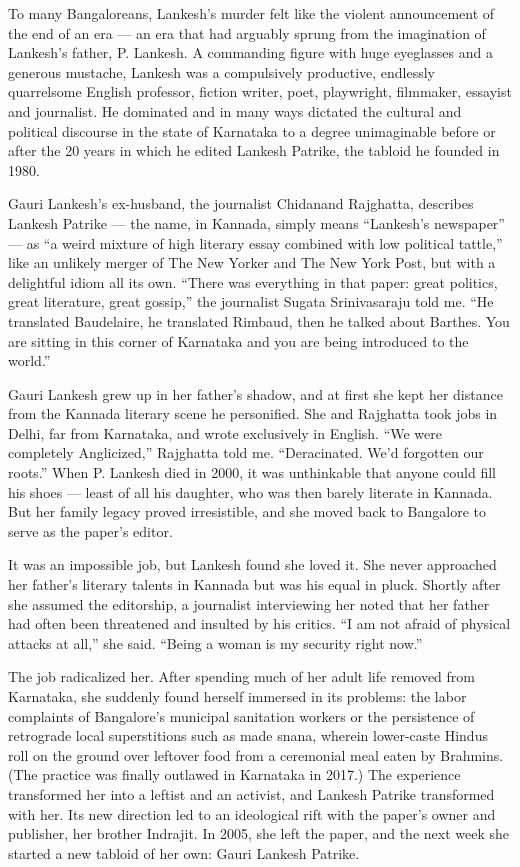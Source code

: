 To many Bangaloreans, Lankesh's murder felt like the violent
announcement of the end of an era --- an era that had arguably sprung
from the imagination of Lankesh's father, P. Lankesh. A commanding
figure with huge eyeglasses and a generous mustache, Lankesh was a
compulsively productive, endlessly quarrelsome English professor,
fiction writer, poet, playwright, filmmaker, essayist and journalist. He
dominated and in many ways dictated the cultural and political discourse
in the state of Karnataka to a degree unimaginable before or after the
20 years in which he edited Lankesh Patrike, the tabloid he founded in
1980.

Gauri Lankesh's ex-husband, the journalist Chidanand Rajghatta,
describes Lankesh Patrike --- the name, in Kannada, simply means
``Lankesh's newspaper'' --- as ``a weird mixture of high literary essay
combined with low political tattle,'' like an unlikely merger of The New
Yorker and The New York Post, but with a delightful idiom all its own.
``There was everything in that paper: great politics, great literature,
great gossip,'' the journalist Sugata Srinivasaraju told me. ``He
translated Baudelaire, he translated Rimbaud, then he talked about
Barthes. You are sitting in this corner of Karnataka and you are being
introduced to the world.''

Gauri Lankesh grew up in her father's shadow, and at first she kept her
distance from the Kannada literary scene he personified. She and
Rajghatta took jobs in Delhi, far from Karnataka, and wrote exclusively
in English. ``We were completely Anglicized,'' Rajghatta told me.
``Deracinated. We'd forgotten our roots.'' When P. Lankesh died in 2000,
it was unthinkable that anyone could fill his shoes --- least of all his
daughter, who was then barely literate in Kannada. But her family legacy
proved irresistible, and she moved back to Bangalore to serve as the
paper's editor.

It was an impossible job, but Lankesh found she loved it. She never
approached her father's literary talents in Kannada but was his equal in
pluck. Shortly after she assumed the editorship, a journalist
interviewing her noted that her father had often been threatened and
insulted by his critics. ``I am not afraid of physical attacks at all,''
she said. ``Being a woman is my security right now.''

The job radicalized her. After spending much of her adult life removed
from Karnataka, she suddenly found herself immersed in its problems: the
labor complaints of Bangalore's municipal sanitation workers or the
persistence of retrograde local superstitions such as made snana,
wherein lower-caste Hindus roll on the ground over leftover food from a
ceremonial meal eaten by Brahmins. (The practice was finally outlawed in
Karnataka in 2017.) The experience transformed her into a leftist and an
activist, and Lankesh Patrike transformed with her. Its new direction
led to an ideological rift with the paper's owner and publisher, her
brother Indrajit. In 2005, she left the paper, and the next week she
started a new tabloid of her own: Gauri Lankesh Patrike.

